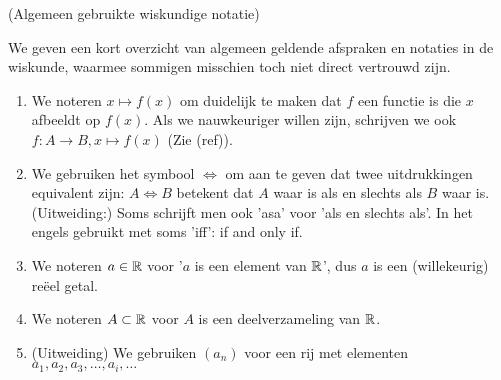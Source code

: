 \documentclass{ximera}
\begin{document}
\begin{notation} (Algemeen gebruikte wiskundige notatie) 
	
	We geven een kort overzicht van algemeen geldende afspraken en notaties in de wiskunde, waarmee sommigen misschien toch niet direct vertrouwd zijn.
	\begin{enumerate}
		\item We noteren $x\mapsto f(x)$ om duidelijk te maken dat $f$ een functie is die $x$ afbeeldt op $f(x)$. Als we nauwkeuriger willen zijn, schrijven we ook $f:A\to B, x\mapsto f(x)$ (Zie (ref)).
		\item We gebruiken het symbool $\iff$ om aan te geven dat twee uitdrukkingen equivalent zijn: $A \iff B$ betekent dat $A$ waar is als en slechts als $B$ waar is. (Uitweiding:) Soms schrijft men ook 'asa' voor 'als en slechts als'. In het engels gebruikt met soms 'iff': if and only if.
		\item We noteren $a\in\mathbb{R}$ voor '$a$ is een element van $\mathbb{R}$', dus $a$ is een (willekeurig) reëel getal.
		\item We noteren $A\subset \mathbb{R}$ voor $A$ is een deelverzameling van $\mathbb{R}$.
		\item (Uitweiding) We gebruiken $(a_n)$ voor een rij met elementen $a_1,a_2,a_3,\dots,a_i,\dots$ 
	\end{enumerate}
\end{notation}
\end{document}
